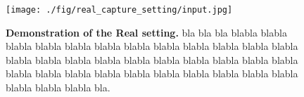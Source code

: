 
\begin{figure}[t]
    \begin{center}
    \texttt{[image: ./fig/real\_capture\_setting/input.jpg]}
    \end{center}
    \vspace{-6mm}
    \caption{{\bf Demonstration of the Real setting.} bla bla bla blabla blabla blabla blabla blabla blabla blabla blabla blabla blabla blabla blabla blabla blabla blabla blabla blabla blabla blabla blabla blabla blabla blabla blabla blabla blabla blabla blabla blabla blabla blabla blabla blabla blabla blabla bla.}
    \label{fig:render_setting}
\end{figure}